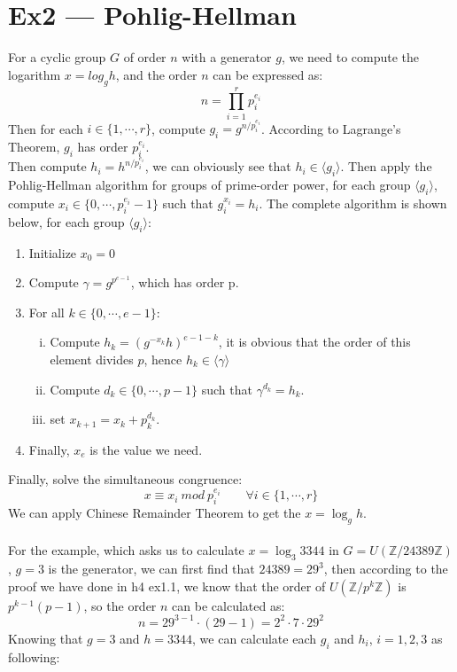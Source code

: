 \documentclass[12pt, a4paper]{article}
\begin{document}
\section*{Ex2 --- Pohlig-Hellman}
For a cyclic group $G$ of order $n$ with a generator $g$, we need to compute the logarithm $x = log_g h$, 
and the order $n$ can be expressed as:
$$n = \prod_{i=1}^r p_i^{e_i}$$
Then for each $i\in \{1,\cdots,r\}$, compute $g_i = g^{n/p_i^{e_i}}$. According to Lagrange's Theorem, 
$g_i$ has order $p_i^{e_i}$.\\
Then compute $h_i = h^{n/p_i^{e_i}}$, we can obviously see that $h_i \in \langle g_i \rangle$. 
Then apply the Pohlig-Hellman algorithm for groups of prime-order power, for each group $\langle g_i\rangle$, 
compute $x_i \in \{0,\cdots,p_i^{e_i} - 1\}$ such that $g_i^{x_i} = h_i$. 
The complete algorithm is shown below, for each group $\langle g_i\rangle$:
\begin{enumerate}
    \item Initialize $x_0 = 0$
    \item Compute $\gamma = g^{p^{e - 1}}$, which has order p.
    \item For all $k \in \{0,\cdots,e-1\}$:
          \begin{enumerate}[(i)]
              \item Compute $h_k = (g^{-x_k}h)^{e-1-k}$, it is obvious that the order of this element divides $p$, 
                    hence $h_k \in \langle\gamma\rangle$
              \item Compute $d_k \in \{0,\cdots,p-1\}$ such that $\gamma^{d_k} = h_k$.
              \item set $x_{k+1} = x_k + p_k^{d_k}$.
          \end{enumerate}
    \item Finally, $x_e$ is the value we need.
\end{enumerate}
Finally, solve the simultaneous congruence:
$$x \equiv x_i\ mod\ p_i^{e_i}\qquad \forall i\in \{1,\cdots,r\}$$
We can apply Chinese Remainder Theorem to get the $x = \log_g h$.\\
\\
For the example, which asks us to calculate $x = \log_3 3344$ in $G = U(\mathbb{Z}/24389\mathbb{Z})$, 
$g = 3$ is the generator, we can first find that $24389 = 29^3$, then according to the proof we have done in h4 ex1.1, 
we know that the order of $U(\mathbb{Z}/p^k\mathbb{Z})$ is $p^{k-1}(p-1)$, so the order $n$ can be calculated as:
$$n = 29^{3-1}\cdot (29-1) = 2^2\cdot 7\cdot 29^2$$
Knowing that $g = 3$ and $h = 3344$, we can calculate each $g_i$ and $h_i$, $i = 1, 2, 3$ as following:
\end{document}
